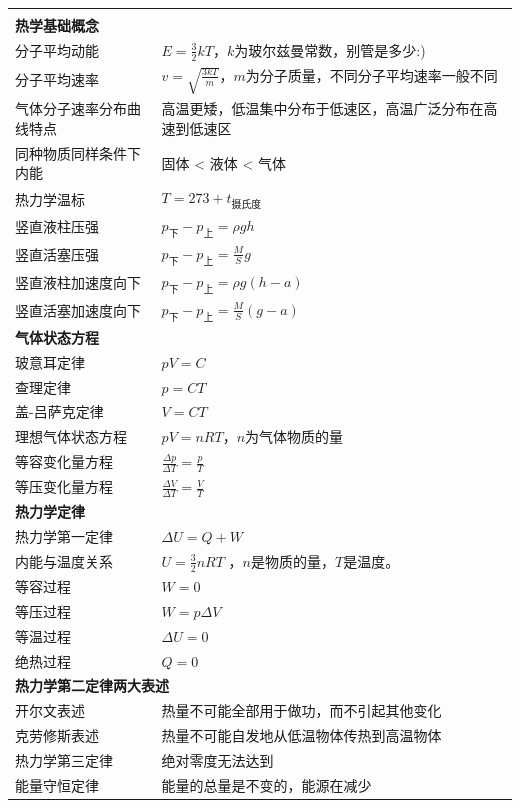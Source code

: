 \documentclass{cheatsheet}
\begin{document}
\begin{tabularx}{\columnwidth}{XX}
	\rowcolor{blue!30}
	\multicolumn{2}{l}{\parbox[c][2.5\ht\strutbox][c]{0.9\columnwidth}{\Large 热学}} \\
	\multicolumn{2}{l}{\textbf{热学基础概念}}\\
	分子平均动能 & $E=\frac{3}{2}kT$，$k$为玻尔兹曼常数，别管是多少:) \\
	分子平均速率 & $v=\sqrt{\frac{3kT}{m}}$，$m$为分子质量，不同分子平均速率一般不同 \\
	气体分子速率分布曲线特点 & 高温更矮，低温集中分布于低速区，高温广泛分布在高速到低速区\\
	同种物质同样条件下内能 & 固体 < 液体 < 气体 \\
	热力学温标 & $T=273+t_{\text{摄氏度}}$ \\
	竖直液柱压强 & $p_{\text{下}}-p_{\text{上}}=\rho gh$\\
	竖直活塞压强 & $p_{\text{下}}-p_{\text{上}}=\frac MSg$\\
	竖直液柱加速度向下 & $p_{\text{下}}-p_{\text{上}}=\rho g(h-a)$\\
	竖直活塞加速度向下 & $p_{\text{下}}-p_{\text{上}}=\frac {M}S(g-a)$\\
	\multicolumn{2}{l}{\textbf{气体状态方程}}\\
	玻意耳定律   & $pV=C$ \\
	查理定律    & $p=CT$  \\
	盖-吕萨克定律 & $V=CT$ \\
	理想气体状态方程 & $pV=nRT$，$n$为气体物质的量 \\
	等容变化量方程 & $\frac {\Delta p}{\Delta T} = \frac pT$\\
	等压变化量方程 & $\frac {\Delta V}{\Delta T} = \frac V{T}$\\
	\multicolumn{2}{l}{\textbf{热力学定律}}\\
	热力学第一定律 & $\Delta U=Q+W$ \\
	内能与温度关系 & $U=\frac{3}{2}nRT$ ，$n$是物质的量，$T$是温度。\\
	等容过程 & $W=0$\\
	等压过程 & $W=p\Delta V$\\
	等温过程 & $\Delta U=0$\\
	绝热过程 & $Q=0$\\
	\multicolumn{2}{l}{\textbf{热力学第二定律两大表述}}\\
	开尔文表述 & 热量不可能全部用于做功，而不引起其他变化\\
	克劳修斯表述 & 热量不可能自发地从低温物体传热到高温物体\\
	热力学第三定律 & 绝对零度无法达到\\
	能量守恒定律 & 能量的总量是不变的，能源在减少\\
\end{tabularx}
\end{document}
